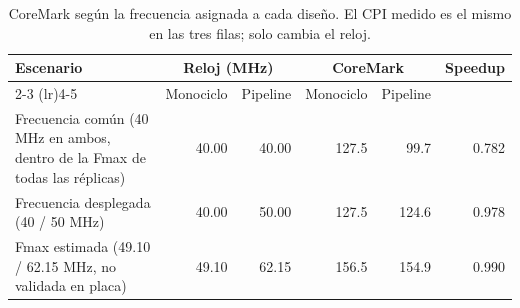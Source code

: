 \begin{table}[htbp]
\centering
\caption{CoreMark según la frecuencia asignada a cada diseño. El CPI medido es el mismo en las tres filas; solo cambia el reloj.}
\label{tab:coremark_scenarios}
\begin{tabular}{lrrrrr}
\toprule
Escenario & \multicolumn{2}{c}{Reloj (MHz)} & \multicolumn{2}{c}{CoreMark} & Speedup \\
\cmidrule(lr){2-3} \cmidrule(lr){4-5}
 & Monociclo & Pipeline & Monociclo & Pipeline & \\
\midrule
Frecuencia común (40 MHz en ambos, dentro de la Fmax de todas las réplicas) & 40.00 & 40.00 & 127.5 & 99.7 & 0.782 \\
Frecuencia desplegada (40 / 50 MHz) & 40.00 & 50.00 & 127.5 & 124.6 & 0.978 \\
Fmax estimada (49.10 / 62.15 MHz, no validada en placa) & 49.10 & 62.15 & 156.5 & 154.9 & 0.990 \\
\bottomrule
\end{tabular}
\end{table}
